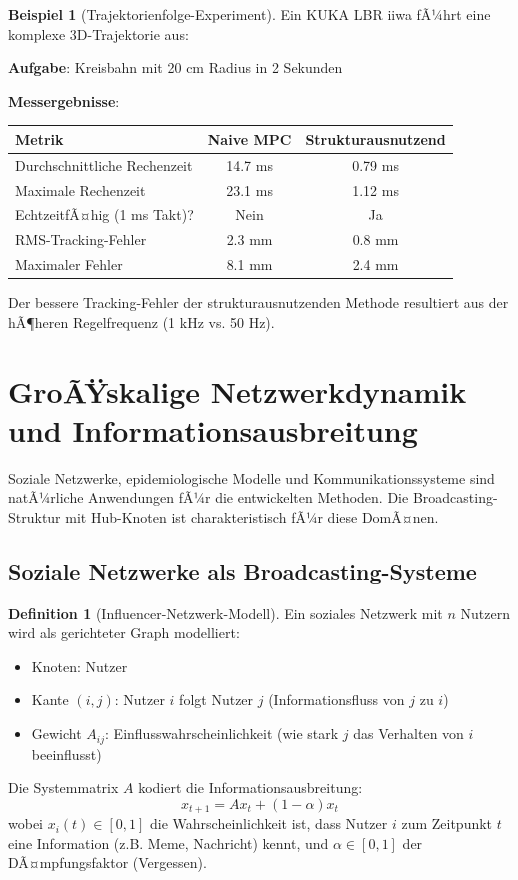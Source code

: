 ﻿\documentclass[a4paper,12pt]{report}
\theoremstyle{definition}
\newtheorem{definition}{Definition}
\newtheorem{beispiel}{Beispiel}
\begin{document}
	\begin{beispiel}[Trajektorienfolge-Experiment]
		Ein KUKA LBR iiwa fÃ¼hrt eine komplexe 3D-Trajektorie aus:
		
		\textbf{Aufgabe}: Kreisbahn mit 20 cm Radius in 2 Sekunden
		
		\textbf{Messergebnisse}:
		\begin{center}
			\begin{tabular}{|l|c|c|}
				\hline
				\textbf{Metrik} & \textbf{Naive MPC} & \textbf{Strukturausnutzend} \\
				\hline
				Durchschnittliche Rechenzeit & 14.7 ms & 0.79 ms \\
				Maximale Rechenzeit & 23.1 ms & 1.12 ms \\
				EchtzeitfÃ¤hig (1 ms Takt)? & Nein & Ja \\
				RMS-Tracking-Fehler & 2.3 mm & 0.8 mm \\
				Maximaler Fehler & 8.1 mm & 2.4 mm \\
				\hline
			\end{tabular}
		\end{center}
		
		Der bessere Tracking-Fehler der strukturausnutzenden Methode resultiert aus der hÃ¶heren Regelfrequenz (1 kHz vs. 50 Hz).
	\end{beispiel}
	
	\section{GroÃŸskalige Netzwerkdynamik und Informationsausbreitung}
	
	Soziale Netzwerke, epidemiologische Modelle und Kommunikationssysteme sind natÃ¼rliche Anwendungen fÃ¼r die entwickelten Methoden. Die Broadcasting-Struktur mit Hub-Knoten ist charakteristisch fÃ¼r diese DomÃ¤nen.
	
	\subsection{Soziale Netzwerke als Broadcasting-Systeme}
	
	\begin{definition}[Influencer-Netzwerk-Modell]
		Ein soziales Netzwerk mit $n$ Nutzern wird als gerichteter Graph modelliert:
		\begin{itemize}
			\item Knoten: Nutzer
			\item Kante $(i,j)$: Nutzer $i$ folgt Nutzer $j$ (Informationsfluss von $j$ zu $i$)
			\item Gewicht $A_{ij}$: Einflusswahrscheinlichkeit (wie stark $j$ das Verhalten von $i$ beeinflusst)
		\end{itemize}
		
		Die Systemmatrix $A$ kodiert die Informationsausbreitung:
		\[
		x_{t+1} = A x_t + (1-\alpha) x_t
		\]
		wobei $x_i(t) \in [0,1]$ die Wahrscheinlichkeit ist, dass Nutzer $i$ zum Zeitpunkt $t$ eine Information (z.B. Meme, Nachricht) kennt, und $\alpha \in [0,1]$ der DÃ¤mpfungsfaktor (Vergessen).
	\end{definition}
	
\end{document}
